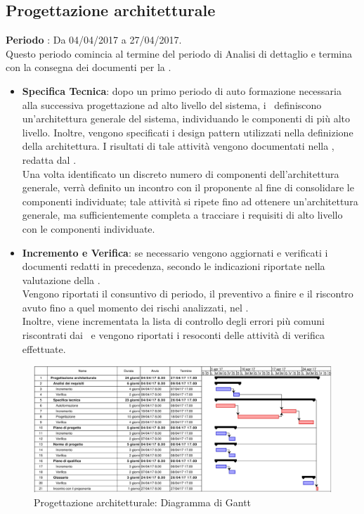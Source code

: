 \documentclass[../PianoDiProgetto.tex]{subfiles}
\begin{document}
	
	
		\subsection{Progettazione architetturale}
		\textbf{Periodo} : Da 04/04/2017 a 27/04/2017. \\
		Questo periodo comincia al termine del periodo di Analisi di dettaglio e termina con la consegna dei documenti per la \revisionediprogettazione.
		\begin{itemize}
			\item \textbf{Specifica Tecnica}: dopo un primo periodo di auto formazione necessaria alla successiva progettazione ad alto livello del sistema, i \progettisti\ definiscono un'architettura generale del sistema, individuando le componenti di più alto livello. Inoltre, vengono specificati i design pattern utilizzati nella definizione della architettura. I risultati di tale attività vengono documentati nella \specificatecnica, redatta dal \progettista. \\
			Una volta identificato un discreto numero di componenti dell'architettura generale, verrà definito un incontro con il proponente al fine di consolidare le componenti individuate; tale attività si ripete fino ad ottenere un'architettura generale, ma sufficientemente completa a tracciare i requisiti di alto livello con le componenti individuate.

			\item \textbf{Incremento e Verifica}: se necessario vengono aggiornati e verificati i documenti redatti in precedenza, secondo le indicazioni riportate nella valutazione della \revisionedeirequisiti. \\ Vengono riportati il consuntivo di periodo, il preventivo a finire e il riscontro avuto fino a quel momento dei rischi analizzati, nel \pianodiprogetto. \\  Inoltre, viene incrementata la lista di controllo degli errori più comuni riscontrati dai \verificatori\ e vengono riportati i resoconti delle attività di verifica effettuate. \\
			
		\end{itemize}
		\begin{figure}[H]
			\centering
			\includegraphics[scale=0.55]{Figures/Gantt_ProgettazioneArchitetturale}
			\caption{Progettazione architetturale: Diagramma di Gantt}
		\end{figure}
		
\end{document}
